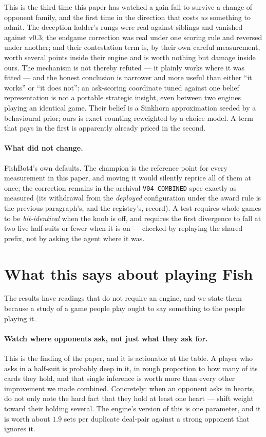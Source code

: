 \documentclass[11pt,a4paper]{article}
\begin{document}
This is the third time this paper has watched a gain fail to survive a
change of opponent family, and the first time in the direction that costs
\emph{us} something to admit. The deception ladder's rungs were real
against siblings and vanished against v0.3; the endgame correction was
real under one scoring rule and reversed under another; and their
contestation term is, by their own careful measurement, worth several
points inside their engine and is worth nothing but damage inside ours.
The mechanism is not thereby refuted --- it plainly works where it was
fitted --- and the honest conclusion is narrower and more useful than
either ``it works'' or ``it does not'': an ask-scoring coordinate tuned
against one belief representation is not a portable strategic insight,
even between two engines playing an identical game. Their belief is a
Sinkhorn approximation seeded by a behavioural prior; ours is exact
counting reweighted by a choice model. A term that pays in the first is
apparently already priced in the second.

\paragraph{What did not change.} FishBot4's own defaults. The champion is the
reference point for every measurement in this paper, and moving it would
silently reprice all of them at once; the correction remains in the archival
\texttt{V04\_COMBINED} spec exactly as measured (its withdrawal from the
\emph{deployed} configuration under the award rule is the previous
paragraph's, and the registry's, record). A test requires whole games to
be \emph{bit-identical} when the knob is off, and requires the first divergence
to fall at two live half-suits or fewer when it is on --- checked by replaying
the shared prefix, not by asking the agent where it was.

\section{What this says about playing Fish}
\label{sec:strategy}

The results have readings that do not require an engine, and we state them
because a study of a game people play ought to say something to the people
playing it.

\paragraph{Watch where opponents ask, not just what they ask for.} This is the
finding of the paper, and it is actionable at the table. A player who asks in a
half-suit is probably deep in it, in rough proportion to how many of its cards
they hold, and that single inference is worth more than every other improvement
we made combined. Concretely: when an opponent asks in hearts, do not only note
the hard fact that they hold at least one heart --- shift weight toward their
holding several. The engine's version of this is one parameter, and it is worth
about $1.9$ sets per duplicate deal-pair against a strong opponent that ignores
it.
\end{document}
